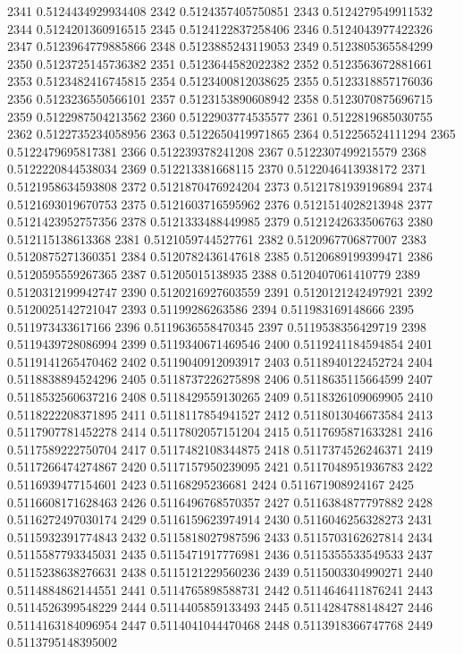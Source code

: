 2341 0.5124434929934408
2342 0.5124357405750851
2343 0.5124279549911532
2344 0.5124201360916515
2345 0.5124122837258406
2346 0.5124043977422326
2347 0.5123964779885866
2348 0.5123885243119053
2349 0.5123805365584299
2350 0.5123725145736382
2351 0.5123644582022382
2352 0.5123563672881661
2353 0.5123482416745815
2354 0.5123400812038625
2355 0.5123318857176036
2356 0.5123236550566101
2357 0.5123153890608942
2358 0.5123070875696715
2359 0.5122987504213562
2360 0.5122903774535577
2361 0.5122819685030755
2362 0.5122735234058956
2363 0.5122650419971865
2364 0.512256524111294
2365 0.5122479695817381
2366 0.512239378241208
2367 0.5122307499215579
2368 0.5122220844538034
2369 0.512213381668115
2370 0.5122046413938172
2371 0.5121958634593808
2372 0.5121870476924204
2373 0.5121781939196894
2374 0.5121693019670753
2375 0.5121603716595962
2376 0.5121514028213948
2377 0.5121423952757356
2378 0.5121333488449985
2379 0.5121242633506763
2380 0.512115138613368
2381 0.5121059744527761
2382 0.5120967706877007
2383 0.5120875271360351
2384 0.5120782436147618
2385 0.5120689199399471
2386 0.5120595559267365
2387 0.51205015138935
2388 0.5120407061410779
2389 0.5120312199942747
2390 0.5120216927603559
2391 0.5120121242497921
2392 0.5120025142721047
2393 0.51199286263586
2394 0.511983169148666
2395 0.511973433617166
2396 0.5119636558470345
2397 0.5119538356429719
2398 0.5119439728086994
2399 0.5119340671469546
2400 0.5119241184594854
2401 0.5119141265470462
2402 0.5119040912093917
2403 0.5118940122452724
2404 0.5118838894524296
2405 0.5118737226275898
2406 0.5118635115664599
2407 0.5118532560637216
2408 0.5118429559130265
2409 0.5118326109069905
2410 0.5118222208371895
2411 0.5118117854941527
2412 0.5118013046673584
2413 0.5117907781452278
2414 0.5117802057151204
2415 0.5117695871633281
2416 0.5117589222750704
2417 0.5117482108344875
2418 0.5117374526246371
2419 0.5117266474274867
2420 0.5117157950239095
2421 0.5117048951936783
2422 0.5116939477154601
2423 0.51168295236681
2424 0.511671908924167
2425 0.5116608171628463
2426 0.5116496768570357
2427 0.5116384877797882
2428 0.5116272497030174
2429 0.5116159623974914
2430 0.5116046256328273
2431 0.5115932391774843
2432 0.5115818027987596
2433 0.5115703162627814
2434 0.5115587793345031
2435 0.5115471917776981
2436 0.5115355533549533
2437 0.5115238638276631
2438 0.5115121229560236
2439 0.5115003304990271
2440 0.5114884862144551
2441 0.5114765898588731
2442 0.5114646411876241
2443 0.5114526399548229
2444 0.5114405859133493
2445 0.5114284788148427
2446 0.5114163184096954
2447 0.5114041044470468
2448 0.5113918366747768
2449 0.5113795148395002

